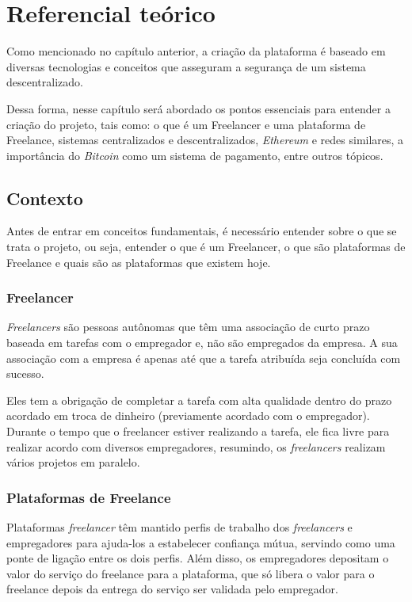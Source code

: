 

\chapter{Referencial teórico}\label{cap_trabalho_academico}

Como mencionado no capítulo anterior, a criação da plataforma é baseado em diversas tecnologias e conceitos que asseguram a segurança de um sistema descentralizado.

Dessa forma, nesse capítulo será abordado os pontos essenciais para entender a criação do projeto, tais como: o que é um Freelancer e uma plataforma de Freelance, sistemas centralizados e descentralizados, \textit{Ethereum} e redes similares, a importância do \textit{Bitcoin} como um sistema de pagamento, entre outros tópicos.

\section{Contexto}

Antes de entrar em conceitos fundamentais, é necessário entender sobre o que se trata o projeto, ou seja, entender o que é um Freelancer, o que são plataformas de Freelance e quais são as plataformas que existem hoje.

\subsection{Freelancer}

\textit{Freelancers} são pessoas autônomas que têm uma associação de curto prazo baseada em tarefas com o empregador e, não são empregados da empresa. A sua associação com a empresa é apenas até que a tarefa atribuída seja concluída com sucesso.\cite{freelance}

Eles tem a obrigação de completar a tarefa com alta qualidade dentro do prazo acordado em troca de dinheiro (previamente acordado com o empregador). Durante o tempo que o freelancer estiver realizando a tarefa, ele fica livre para realizar acordo com diversos empregadores, resumindo, os \textit{freelancers} realizam vários projetos em paralelo.

\subsection{Plataformas de Freelance}
Plataformas \textit{freelancer} têm mantido perfis de trabalho dos \textit{freelancers} e empregadores para ajuda-los a estabelecer confiança mútua, servindo como uma ponte de ligação entre os dois perfis. Além disso, os empregadores depositam o valor do serviço do freelance para a plataforma, que só libera o valor para o freelance depois da entrega do serviço ser validada pelo empregador.\cite{freelance}

